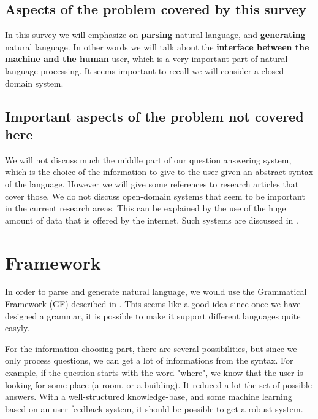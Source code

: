 \documentclass[a4paper,11pt]{article}
\begin{document}
\subsection{Aspects of the problem covered by this survey}
In this survey we will emphasize on \textbf{parsing} natural language, and
\textbf{generating} natural language. In other words we will talk about the
\textbf{interface between the machine and the human} user, which is a very
important part of natural language processing. It seems important to recall
we will consider a closed-domain system.

\subsection{Important aspects of the problem not covered here}
We will not discuss much the middle part of our question answering system, which
is the choice of the information to give to the user given an abstract syntax of
the language. However we will give some references to research articles that
cover those. We do not discuss open-domain systems that seem to be important in
the current research areas. This can be explained by the use of the huge amount
of data that is offered by the internet. Such systems are discussed in
\cite{designinganopendomainqasystem}.

\section{Framework}
In order to parse and generate  natural language, we would use the Grammatical
Framework (GF) described in \cite{ranta-2011}. This seems like a good idea since
once we have designed a grammar, it is possible to make it support different
languages quite easyly.

For the information choosing part, there are several possibilities, but since
we only process questions, we can get a lot of informations from the syntax. For
example, if the question starts with the word "where", we know that the user is
looking for some place (a room, or a building). It reduced a lot the set of
possible answers. With a well-structured knowledge-base, and some machine
learning based on an user feedback system, it should be possible to get a robust
system.
\end{document}
